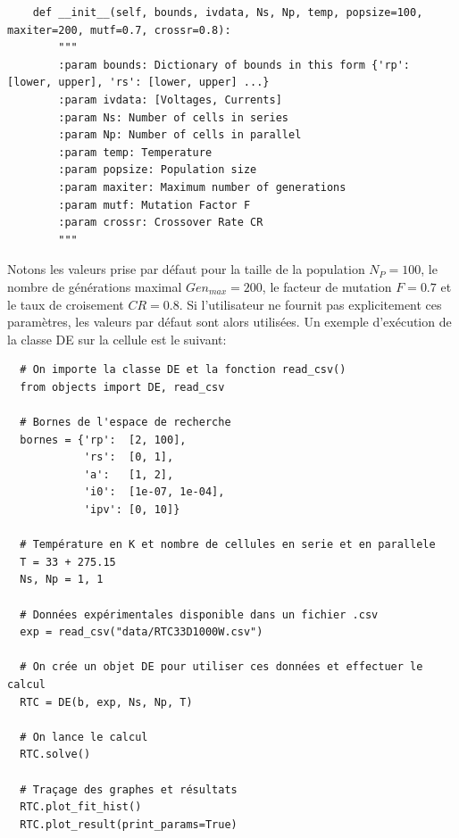 \begin{verbatim}
    def __init__(self, bounds, ivdata, Ns, Np, temp, popsize=100, maxiter=200, mutf=0.7, crossr=0.8):
        """
        :param bounds: Dictionary of bounds in this form {'rp': [lower, upper], 'rs': [lower, upper] ...}
        :param ivdata: [Voltages, Currents]
        :param Ns: Number of cells in series
        :param Np: Number of cells in parallel
        :param temp: Temperature
        :param popsize: Population size
        :param maxiter: Maximum number of generations
        :param mutf: Mutation Factor F
        :param crossr: Crossover Rate CR
        """
\end{verbatim}
Notons les valeurs prise par défaut pour la taille de la population $N_P = 100$, le nombre de générations maximal $Gen_{max} = 200$, le facteur de mutation $F = 0.7$ et le taux de croisement $CR = 0.8$. Si l'utilisateur ne fournit pas explicitement ces paramètres, les valeurs par défaut sont alors utilisées.
 Un exemple d'exécution de la classe DE sur la cellule est le suivant:

\begin{verbatim}
  # On importe la classe DE et la fonction read_csv()
  from objects import DE, read_csv

  # Bornes de l'espace de recherche
  bornes = {'rp':  [2, 100],
            'rs':  [0, 1],
            'a':   [1, 2],
            'i0':  [1e-07, 1e-04],
            'ipv': [0, 10]}
  
  # Température en K et nombre de cellules en serie et en parallele
  T = 33 + 275.15
  Ns, Np = 1, 1

  # Données expérimentales disponible dans un fichier .csv
  exp = read_csv("data/RTC33D1000W.csv")

  # On crée un objet DE pour utiliser ces données et effectuer le calcul
  RTC = DE(b, exp, Ns, Np, T)

  # On lance le calcul
  RTC.solve()

  # Traçage des graphes et résultats
  RTC.plot_fit_hist()
  RTC.plot_result(print_params=True)
\end{verbatim}

